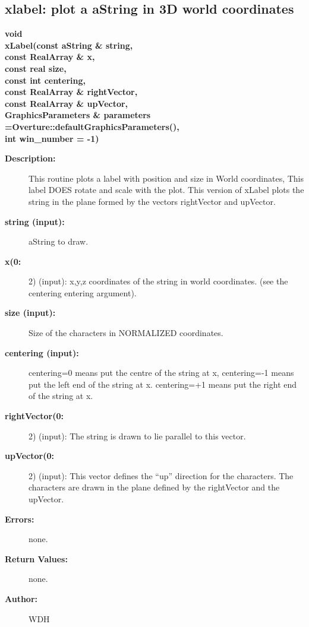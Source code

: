 \subsection{xlabel: plot a aString in 3D world coordinates}
 
\begin{flushleft} \textbf{%
void   \\ 
\settowidth{\GLGraphicsInterfaceIncludeArgIndent}{xLabel(}%
xLabel(const aString \& string,     \\ 
\hspace{\GLGraphicsInterfaceIncludeArgIndent}const RealArray \& x,  \\ 
\hspace{\GLGraphicsInterfaceIncludeArgIndent}const real size,      \\ 
\hspace{\GLGraphicsInterfaceIncludeArgIndent}const int centering,\\ 
\hspace{\GLGraphicsInterfaceIncludeArgIndent}const RealArray \& rightVector,  \\ 
\hspace{\GLGraphicsInterfaceIncludeArgIndent}const RealArray \& upVector,\\ 
GraphicsParameters \& parameters   =Overture::defaultGraphicsParameters(),\\ 
\hspace{\GLGraphicsInterfaceIncludeArgIndent}int win\_number  = -1)
}\end{flushleft}
\begin{description}
\item[{\bf Description:}] 
    This routine plots a label with position and size in World coordinates, 
    This label DOES rotate and scale with the plot. This version of xLabel 
    plots the string in the plane formed by the vectors {\ff rightVector}
    and {\ff upVector}.
\item[{\bf string (input):}]  aString to draw.
\item[{\bf x(0:}] 2) (input): x,y,z coordinates of the string in world coordinates.
    (see the centering entering argument).
\item[{\bf size (input):}]  Size of the characters in NORMALIZED coordinates.
\item[{\bf centering (input):}]  {\ff centering=0} means put the centre of the string at {\ff x},
    {\ff centering=-1} means put the left end of the string at {\ff x}.
    {\ff centering=+1} means put the right end of the string at {\ff x}.
\item[{\bf rightVector(0:}] 2) (input): The string is drawn to lie parallel to this vector.
\item[{\bf upVector(0:}] 2) (input): This vector defines the ``up'' direction for the characters. The
     characters are drawn in the plane defined by the rightVector and the upVector.
\item[{\bf Errors:}]  none.
\item[{\bf Return Values:}]  none.
  
\item[{\bf Author:}]  WDH
\end{description}
